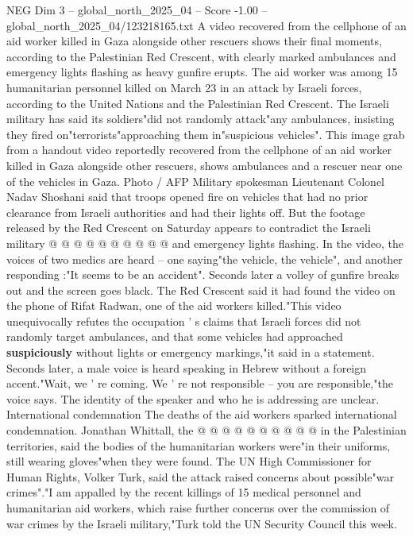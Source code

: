\begin{textsample}{NEG Dim 3 – global\_north\_2025\_04 – Score -1.00 – global\_north\_2025\_04/123218165.txt}  \label{ex:f3_neg_407}
A video recovered from the cellphone of an aid worker killed in Gaza alongside other rescuers shows their final moments, according to the Palestinian Red Crescent, with clearly marked ambulances and emergency lights flashing as heavy gunfire erupts.
The aid worker was among 15 humanitarian personnel killed on March 23 in an attack by Israeli forces, according to the United Nations and the Palestinian Red Crescent.
The Israeli military has said its soldiers"did not randomly attack"any ambulances, insisting they fired on"terrorists"approaching them in"suspicious vehicles".
This image grab from a handout video reportedly recovered from the cellphone of an aid worker killed in Gaza alongside other rescuers, shows ambulances and a rescuer near one of the vehicles in Gaza.
Photo / AFP Military spokesman Lieutenant Colonel Nadav Shoshani said that troops opened fire on vehicles that had no prior clearance from Israeli authorities and had their lights off.
But the footage released by the Red Crescent on Saturday appears to contradict the Israeli military @ @ @ @ @ @ @ @ @ @ and emergency lights flashing.
In the video, the voices of two medics are heard -- one saying"the vehicle, the vehicle", and another responding :"It seems to be an accident".
Seconds later a volley of gunfire breaks out and the screen goes black.
The Red Crescent said it had found the video on the phone of Rifat Radwan, one of the aid workers killed."This video unequivocally refutes the occupation ' s claims that Israeli forces did not randomly target ambulances, and that some vehicles had approached \textbf{suspiciously} without lights or emergency markings,"it said in a statement.
Seconds later, a male voice is heard speaking in Hebrew without a foreign accent."Wait, we ' re coming.
We ' re not responsible -- you are responsible,"the voice says.
The identity of the speaker and who he is addressing are unclear.
International condemnation The deaths of the aid workers sparked international condemnation.
Jonathan Whittall, the @ @ @ @ @ @ @ @ @ @ in the Palestinian territories, said the bodies of the humanitarian workers were"in their uniforms, still wearing gloves"when they were found.
The UN High Commissioner for Human Rights, Volker Turk, said the attack raised concerns about possible"war crimes"."I am appalled by the recent killings of 15 medical personnel and humanitarian aid workers, which raise further concerns over the commission of war crimes by the Israeli military,"Turk told the UN Security Council this week.

\end{textsample}
